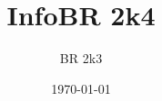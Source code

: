 \documentclass[a4paper,11pt]{article}
\title{InfoBR 2k4}
\author{BR 2k3}
\date{\today}
\begin{document}



\pagebreak
\tableofcontents

\pagebreak


\pagebreak


\pagebreak


\pagebreak

\end{document}
